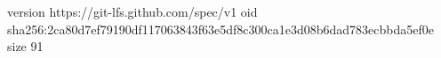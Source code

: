 version https://git-lfs.github.com/spec/v1
oid sha256:2ca80d7ef79190df117063843f63e5df8c300ca1e3d08b6dad783ecbbda5ef0e
size 91
